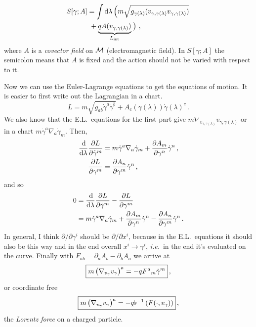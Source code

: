 \begin{example}
    \begin{align*}
        S[\gamma;A] &= \int\diff\lambda \left(m\sqrt{g_{\gamma(\lambda)} ( v_{\gamma, \gamma(\lambda)} v_{\gamma, \gamma(\lambda)})}\right.\\
        &~+\underbrace{q A(v_{\gamma, \gamma(\lambda)})}_{L_\text{int}}\left.\vphantom{\sqrt{g_{\gamma(\lambda)}}}\right)\,,
    \end{align*}
    where $A$ is a \textit{covector field} on $\mathcal{M}$ (electromagnetic field).
    In $S[\gamma;A]$ the semicolon means that $A$ is fixed and the action should not be varied with respect to it.

    Now we can use the Euler-Lagrange equations to get the equations of motion.
    It is easier to first write out the Lagrangian in a chart.
    \begin{equation*}
        L = m \sqrt{g_{ab}\dot{\gamma}^a\dot{\gamma}^b} + A_c(\gamma(\lambda)) \dot{\gamma}(\lambda)^c\,.
    \end{equation*}
    We also know that the E.L.\ equations for the first part give $m\nabla_{v_{\gamma, \gamma(\lambda)}}
    v_{\gamma, \gamma(\lambda)}$ or in a chart $m \dot{\gamma}^a\nabla_a \dot{\gamma}_m$.
    Then,
    \begin{align*}
        \frac{\operatorname{d\!}}{\operatorname{d\!} \lambda}\frac{\partial L}{\partial \dot{\gamma}^m} &= 
        m \dot{\gamma}^a\nabla_a \dot{\gamma}_m + \frac{\partial A_m}{\partial \gamma^n}\dot{\gamma}^n\,,\\
        \frac{\partial L}{\partial \gamma^m} &= \frac{\partial A_n}{\partial \gamma^m}\dot{\gamma}^n\,,
    \end{align*}
    and so
    \begin{align*}
        0 &= \frac{\operatorname{d\!}}{\operatorname{d\!} \lambda}\frac{\partial L}{\partial \dot{\gamma}^m} - 
        \frac{\partial L}{\partial \gamma^m}\\
        &= 
        m \dot{\gamma}^a\nabla_a \dot{\gamma}_m + \frac{\partial A_m}{\partial \gamma^n}\dot{\gamma}^n
        - \frac{\partial A_n}{\partial \gamma^m}\dot{\gamma}^n\,.
    \end{align*}
    In general, I think $\partial/\partial\gamma^i$ should be $\partial/\partial x^i$, because in the
    E.L.\ equations it should also be this way and in the end overall $x^i \to \gamma^i$,
    \textit{i.e.}\ in the end it's evaluated on the curve.
    Finally with $F_{ab} = \partial_a A_b - \partial_b A_a$ we arrive at
    \begin{equation}
        \boxed{%
        m \left( \nabla_{v_\gamma}v_\gamma \right)^a = -q F^a{}_m \dot{\gamma}^m
    }\,,
    \end{equation}
    or coordinate free
    \begin{equation}
        \boxed{%
        m \left( \nabla_{v_\gamma}v_\gamma \right)^a =
        -q \flat^{-1}\left( F(\cdot, v_\gamma) \right)
    }\,,
    \end{equation}
    the \textit{Lorentz force} on a charged particle.


\end{example}
